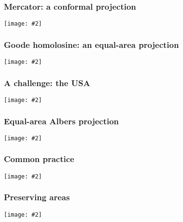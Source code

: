 \documentclass{beamer}
\newcommand{\fig}[2]{\centerline{\texttt{[image: \#2]}}}
\newcommand{\bfr}[1]{\begin{frame}[fragile]\frametitle{{ #1 }}}
\begin{document}
\bfr{Mercator: a conformal projection}
\fig{1}{world-mercator-1.png}
\end{frame}

\bfr{Goode homolosine: an equal-area projection}
\fig{1.2}{world-goode-1.png}
\end{frame}

\bfr{A challenge: the USA}
\fig{1}{usa-orthographic-1.png}
\end{frame}

\bfr{Equal-area Albers projection}
\fig{1}{usa-true-albers-1.png}
\end{frame}

\bfr{Common practice}
\fig{1}{usa-albers-1.png}
\end{frame}

\bfr{Preserving areas}
\fig{1}{usa-albers-revised-1.png}
\end{frame}
\end{document}
